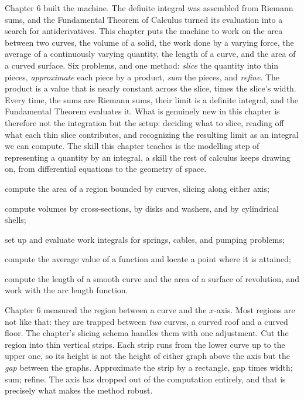 \documentclass[a4paper,12pt,oneside]{memoir}
\begin{document}
\begin{lead}
Chapter 6 built the machine. The definite integral was assembled from Riemann sums, and the Fundamental Theorem of Calculus turned its evaluation into a search for antiderivatives. This chapter puts the machine to work on the area between two curves, the volume of a solid, the work done by a varying force, the average of a continuously varying quantity, the length of a curve, and the area of a curved surface. Six problems, and one method: \emph{slice} the quantity into thin pieces, \emph{approximate} each piece by a product, \emph{sum} the pieces, and \emph{refine}. The product is a value that is nearly constant across the slice, times the slice’s width. Every time, the sums are Riemann sums, their limit is a definite integral, and the Fundamental Theorem evaluates it. What is genuinely new in this chapter is therefore not the integration but the setup: deciding what to slice, reading off what each thin slice contributes, and recognizing the resulting limit as an integral we can compute. The skill this chapter teaches is the modelling step of representing a quantity by an integral, a skill the rest of calculus keeps drawing on, from differential equations to the geometry of space.
\end{lead}
\begin{objectives}
  \item compute the area of a region bounded by curves, slicing along either axis;
  \item compute volumes by cross-sections, by disks and washers, and by cylindrical shells;
  \item set up and evaluate work integrals for springs, cables, and pumping problems;
  \item compute the average value of a function and locate a point where it is attained;
  \item compute the length of a smooth curve and the area of a surface of revolution, and work with the arc length function.
\end{objectives}
Chapter 6 measured the region between a curve and the \(x\)-axis. Most regions are not like that: they are trapped between \emph{two} curves, a curved roof and a curved floor. The chapter’s slicing schema handles them with one adjustment. Cut the region into thin vertical strips. Each strip runs from the lower curve up to the upper one, so its height is not the height of either graph above the axis but the \emph{gap} between the graphs. Approximate the strip by a rectangle, gap times width; sum; refine. The axis has dropped out of the computation entirely, and that is precisely what makes the method robust.
\end{document}
